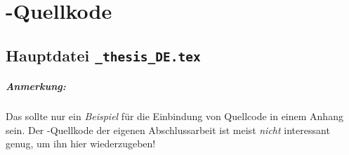 \chapter{\latex-Quellkode}
\label{app:latex}

\section*{Hauptdatei \texttt{\_thesis\_DE.tex}}

\paragraph{Anmerkung:}
Das sollte nur ein \emph{Beispiel} für die Einbindung von Quellcode
in einem Anhang sein. Der \latex-Quellkode der eigenen
Abschlussarbeit ist meist \emph{nicht} interessant genug, um ihn hier
wiederzugeben!

\begin{footnotesize}

\end{footnotesize}





